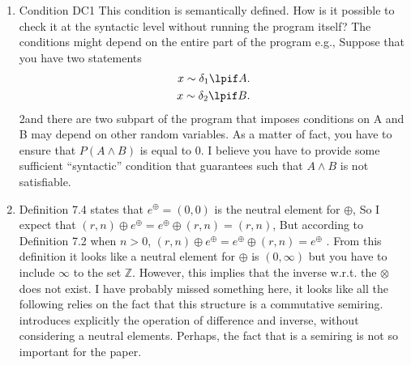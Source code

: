 \begin{enumerate}
\item Condition DC1 This condition is semantically defined. How is it possible
to check it at the syntactic level without running the program itself? The
conditions might depend on the entire part of the program e.g., Suppose
that you have two statements
\begin{align*}
    x \sim \delta_1 \lpif A.
    \\
    x \sim \delta_2 \lpif B.
\end{align*}
2and there are two subpart of the program that imposes conditions on A
and B may depend on other random variables. As a matter of fact, you
have to ensure that $P(A \land B)$ is equal to $0$. I believe you have to provide
some sufficient “syntactic” condition that guarantees such that $A \land B$ is
not satisfiable.


\item Definition 7.4 states that $e^\oplus = (0, 0)$ is the neutral element for $\oplus$, So I
expect that $(r, n) \oplus  e^\oplus  = e^\oplus  \oplus  (r, n) = (r, n)$, But according to Definition
7.2 when $n > 0$, $(r, n) \oplus  e^\oplus  = e^\oplus  \oplus  (r, n) = e^\oplus $ . From this definition it
looks like a neutral element for $\oplus $ is $(0, \infty)$ but you have to include $\infty$ to
the set $\mathbb{Z}$. However, this implies that the inverse w.r.t. the $\otimes$ does not
exist. I have probably missed something here, it looks like all the following
relies on the fact that this structure is a commutative semiring. \citet{jacobs2021paradoxes} introduces explicitly the operation of difference and inverse, without
considering a neutral elements. Perhaps, the fact that is a semiring is not
so important for the paper.




\end{enumerate}
